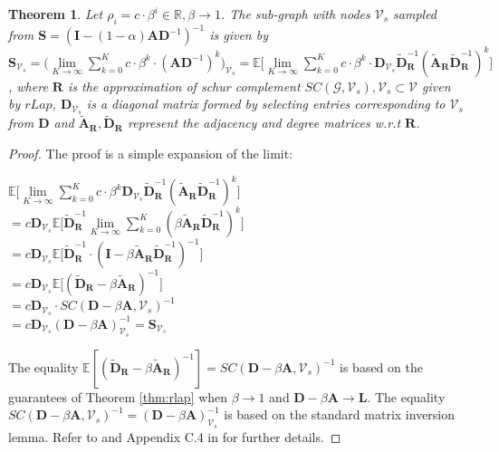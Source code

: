 \documentclass{article}
\def\mA{{\mathbf{A}}}
\def\mD{{\mathbf{D}}}
\def\mI{{\mathbf{I}}}
\def\mL{{\mathbf{L}}}
\def\mR{{\mathbf{R}}}
\def\mS{{\mathbf{S}}}
\def\gG{{\mathcal{G}}}
\def\gV{{\mathcal{V}}}
\def\sR{{\mathbb{R}}}
\theoremstyle{plain}
\newtheorem{theorem}{Theorem}[section]
\theoremstyle{definition}
\theoremstyle{remark}
\begin{document}
\begin{theorem}
\label{thm:theta_schur}
Let $\rho_i = c\cdot \beta^i \in \sR, \beta \to 1$. The sub-graph with nodes $\gV_s$ sampled from $\mS=(\mI - (1-\alpha)\mA\mD^{-1})^{-1}$ is given by $\mS_{\gV_s} = \bigg(\lim\limits_{K \rightarrow \infty} \sum_{k = 0}^K c \cdot \beta^k \cdot (\mA\mD^{-1})^k \bigg)_{\gV_s} = \mathbb{E} \bigg[ \lim\limits_{K \rightarrow \infty} \sum_{k = 0}^K c \cdot \beta^k \cdot \mD_{\gV_s}\widetilde{\mD}_{\mR}^{-1}(\widetilde{\mA}_{\mR}\widetilde{\mD}_{\mR}^{-1})^k \bigg] $, where $\mR$ is the approximation of schur complement $SC(\gG, \gV_s), \gV_s \subset \gV$ given by $rLap$, $\mD_{\gV_s}$ is a diagonal matrix formed by selecting entries corresponding to $\gV_s$ from $\mD$ and $\widetilde{\mA}_{\mR}, \widetilde{\mD}_{\mR}$ represent the adjacency and degree matrices w.r.t $\mR$.
\end{theorem}
\begin{proof}
The proof is a simple expansion of the limit:

$\mathbb{E} \bigg[ \lim\limits_{K \rightarrow \infty} \sum_{k = 0}^K c\cdot \beta^k \mD_{\gV_s}\widetilde{\mD}_{\mR}^{-1} (\widetilde{\mA}_{\mR}\widetilde{\mD}_{\mR}^{-1})^k \bigg]$ \\ 
$= c \mD_{\gV_s} \mathbb{E} \big[ \widetilde{\mD}_{\mR}^{-1}\lim\limits_{K \rightarrow \infty} \sum_{k = 0}^K(\beta \widetilde{\mA}_{\mR}\widetilde{\mD}_{\mR}^{-1})^k \big]$\\ 
$= c \mD_{\gV_s} \mathbb{E} \big[ \widetilde{\mD}_{\mR}^{-1}\cdot(\mI - \beta \widetilde{\mA}_{\mR}\widetilde{\mD}_{\mR}^{-1})^{-1} \big]$\\
$= c \mD_{\gV_s} \mathbb{E} \big[ (\widetilde{\mD}_{\mR} - \beta \widetilde{\mA}_{\mR})^{-1} \big]$\\
$= c \mD_{\gV_s} \cdot SC(\mD - \beta \mA, \gV_s)^{-1}$ \\
$= c \mD_{\gV_s} (\mD - \beta \mA)^{-1}_{\gV_s} = \mS_{\gV_s}$

The equality $\mathbb{E}[(\widetilde{\mD}_{\mR} - \beta \widetilde{\mA}_{\mR})^{-1}] = SC(\mD - \beta \mA, \gV_s)^{-1}$
is based on the guarantees of Theorem \ref{thm:rlap} when $\beta \to 1$ and $\mD - \beta \mA \to \mL$. The equality $SC(\mD - \beta \mA, \gV_s)^{-1} = (\mD - \beta \mA)^{-1}_{\gV_s}$ is based on the standard matrix inversion lemma. Refer to \citet{gallier2010notes} and Appendix C.4 in \citet{boyd2004convex} for further details.
\end{proof}
\end{document}
